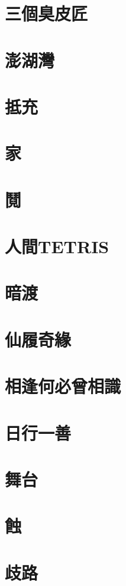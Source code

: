 \documentclass[hyperref]{ctexbook}
\begin{document}
\chapter{三個臭皮匠}
\chapter{澎湖灣}
\chapter{抵充}
\chapter{家}
\chapter{鬩}
\chapter{人間TETRIS}
\chapter{暗渡}
\chapter{仙履奇緣}
\chapter{相逢何必曾相識}
\chapter{日行一善}
\chapter{舞台}
\chapter{蝕}
\chapter{歧路}
\end{document}
